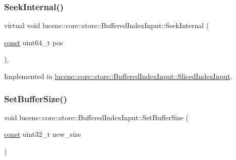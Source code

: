\subsubsection{\texorpdfstring{Seek\+Internal()}{SeekInternal()}}
{\footnotesize\ttfamily virtual void lucene\+::core\+::store\+::\+Buffered\+Index\+Input\+::\+Seek\+Internal (\begin{DoxyParamCaption}\item[{\mbox{\hyperlink{ZlibCrc32_8h_a2c212835823e3c54a8ab6d95c652660e}{const}} uint64\+\_\+t}]{pos }\end{DoxyParamCaption})\hspace{0.3cm}{\ttfamily [protected]}, {}}



Implemented in \mbox{\hyperlink{classlucene_1_1core_1_1store_1_1BufferedIndexInput_1_1SlicedIndexInput_ad30088ab555e9bc4fb5f180d57ca228d}{lucene\+::core\+::store\+::\+Buffered\+Index\+Input\+::\+Sliced\+Index\+Input}}.

\mbox{\label{classlucene_1_1core_1_1store_1_1BufferedIndexInput_aceef7ceac7a71e741f70fa5ae45da43e}} 
\subsubsection{\texorpdfstring{Set\+Buffer\+Size()}{SetBufferSize()}}
{\footnotesize\ttfamily void lucene\+::core\+::store\+::\+Buffered\+Index\+Input\+::\+Set\+Buffer\+Size (\begin{DoxyParamCaption}\item[{\mbox{\hyperlink{ZlibCrc32_8h_a2c212835823e3c54a8ab6d95c652660e}{const}} uint32\+\_\+t}]{new\+\_\+size }\end{DoxyParamCaption})\hspace{0.3cm}{\ttfamily [inline]}}

\mbox{\label{classlucene_1_1core_1_1store_1_1BufferedIndexInput_a0fd5c90945647f8f9b306c1a318a83fc}} 
